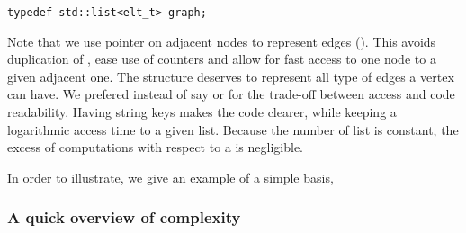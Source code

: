 \begin{lstlisting}[language=CoreCpp, style=Light, breaklines=true]
typedef std::list<elt_t> graph;
\end{lstlisting}

\noindent Note that we use pointer on adjacent nodes to represent edges 
(). This avoids duplication of , ease use 
of counters and allow for fast access to one node to a given adjacent one. The 
 structure deserves to represent all type of edges a vertex can have.
We prefered  instead of say  or  for the 
trade-off between access and code readability. Having string keys makes the code
clearer, while keeping a logarithmic access time to a given list. Because the 
number of list is constant, the excess of computations with respect to a 
 is negligible. 

\vspace{1.2em}

In order to illustrate, we give an example of a simple basis, 


\subsubsection{A quick overview of complexity}





















